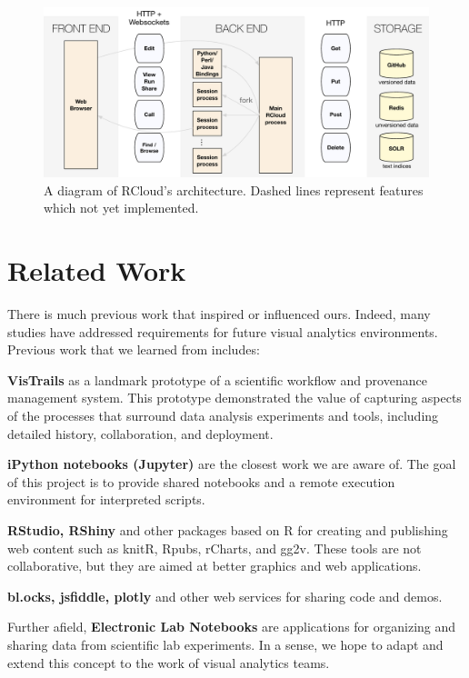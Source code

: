 \begin{figure}
\includegraphics[width=\linewidth]{fig/system/system.pdf}
\caption{\label{fig:system}A diagram of RCloud's architecture. Dashed
  lines represent features which not yet implemented. }
\end{figure}

\section{Related Work}

There is much previous work that inspired or influenced ours.
Indeed, many studies have addressed requirements for future visual
analytics environments.
Previous work that we learned from includes:

{\bf VisTrails} as a landmark prototype of a scientific workflow
and provenance management system. This prototype demonstrated
the value of capturing aspects of the processes that
surround data analysis experiments and tools, including detailed
history, collaboration, and deployment.

{\bf iPython notebooks (Jupyter)} are the closest work we are aware of.
The goal of this project is to provide shared notebooks and a remote
execution environment for interpreted scripts. 

{\bf RStudio, RShiny} and other packages based on R for creating and
publishing web content such as knitR, Rpubs, rCharts, and gg2v.
These tools are not collaborative, but they are aimed at better
graphics and web applications.

{\bf bl.ocks, jsfiddle, plotly} and other web services for sharing code
and demos.

Further afield, {\bf Electronic Lab Notebooks} are applications for organizing
and sharing data from scientific lab experiments\cite{Rubacha:2011:ELN}.
In a sense, we hope to adapt and extend this concept to the work of
visual analytics teams.

